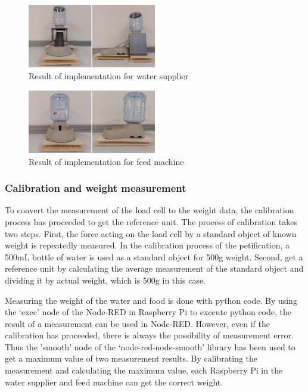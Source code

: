 \documentclass[conference]{IEEEtran}
\begin{document}
\begin{figure}[htbp]
\centerline{\includegraphics[width=0.5\textwidth]{./images/Water Supplier.jpg}}
\caption{Result of implementation for water supplier}
\label{fig}
\end{figure}

\begin{figure}[htbp]
\centerline{\includegraphics[width=0.5\textwidth]{./images/Feed Machine.jpg}}
\caption{Result of implementation for feed machine}
\label{fig}
\end{figure}

\subsubsection{Calibration and weight measurement}
To convert the measurement of the load cell to the weight data, the calibration process has proceeded to get the reference unit. The process of calibration takes two steps. First, the force acting on the load cell by a standard object of known weight is repeatedly measured. In the calibration process of the petification, a 500mL bottle of water is used as a standard object for 500g weight. Second, get a reference unit by calculating the average measurement of the standard object and dividing it by actual weight, which is 500g in this case.

Measuring the weight of the water and food is done with python code. By using the ‘exec’ node of the Node-RED in Raspberry Pi to execute python code, the result of a measurement can be used in Node-RED. However, even if the calibration has proceeded, there is always the possibility of measurement error. Thus the ’smooth’ node of the ‘node-red-node-smooth’ library has been used to get a maximum value of two measurement results. By calibrating the measurement and calculating the maximum value, each Raspberry Pi in the water supplier and feed machine can get the correct weight.
\end{document}
